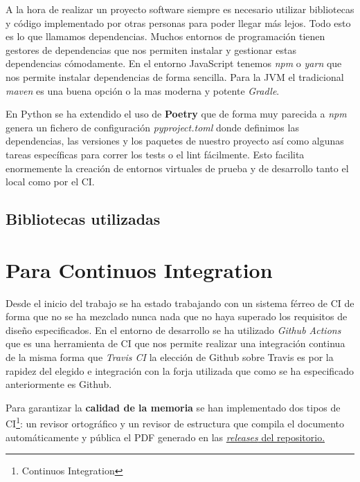A la hora de realizar un proyecto software siempre es necesario utilizar bibliotecas y código implementado por otras personas para poder llegar más lejos. Todo esto es lo que llamamos dependencias. Muchos entornos de programación tienen gestores de dependencias que nos permiten instalar y gestionar estas dependencias cómodamente. En el entorno JavaScript tenemos \textit{npm} o \textit{yarn} que nos permite instalar dependencias de forma sencilla. Para la JVM el tradicional \textit{maven} es una buena opción o la mas moderna y potente \textit{Gradle}.

En Python se ha extendido el uso de \textbf{Poetry} que de forma muy parecida a \textit{npm} genera un fichero de configuración \textit{pyproject.toml} donde definimos las dependencias, las versiones y los paquetes de nuestro proyecto así como algunas tareas específicas para correr los tests o el lint fácilmente. Esto facilita enormemente la creación de entornos virtuales de prueba y de desarrollo tanto el local como por el CI.

\subsection{Bibliotecas utilizadas}

\section{Para Continuos Integration}
Desde el inicio del trabajo se ha estado trabajando con un sistema férreo de CI de forma que no se ha mezclado nunca nada que no haya superado los requisitos de diseño especificados. En el entorno de desarrollo se ha utilizado \textit{Github Actions} que es una herramienta de CI que nos permite realizar una integración continua de la misma forma que \textit{Travis CI} la elección de Github sobre Travis es por la rapidez del elegido e integración con la forja utilizada que como se ha especificado anteriormente es Github.

Para garantizar la \textbf{calidad de la memoria} se han implementado dos tipos de CI\footnote{Continuos Integration}: un revisor ortográfico y un revisor de estructura que compila el documento automáticamente y pública el PDF generado en las \href{https://github.com/pablojjimenez/TFG/releases}{\textit{releases} del repositorio.}

